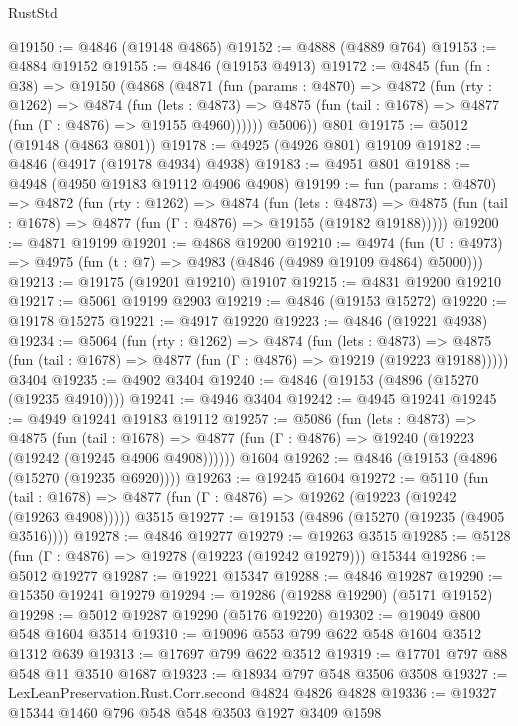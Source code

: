 \begin{lexlean}{RustStd}
\begin{coremodule}
@19150 := @4846 (@19148 @4865)
@19152 := @4888 (@4889 @764)
@19153 := @4884 @19152
@19155 := @4846 (@19153 @4913)
@19172 := @4845
    (fun (fn : @38) =>
    @19150
      (@4868
        (@4871
          (fun (params : @4870) =>
          @4872
            (fun (rty : @1262) =>
            @4874
              (fun (lets : @4873) =>
              @4875 (fun (tail : @1678) => @4877 (fun (Γ : @4876) => @19155 @4960))))))
        @5006))
    @801
@19175 := @5012 (@19148 (@4863 @801))
@19178 := @4925 (@4926 @801) @19109
@19182 := @4846 (@4917 (@19178 @4934) @4938)
@19183 := @4951 @801
@19188 := @4948 (@4950 @19183 @19112 @4906 @4908)
@19199 := fun (params : @4870) =>
  @4872
    (fun (rty : @1262) =>
    @4874
      (fun (lets : @4873) =>
      @4875 (fun (tail : @1678) => @4877 (fun (Γ : @4876) => @19155 (@19182 @19188)))))
@19200 := @4871 @19199
@19201 := @4868 @19200
@19210 := @4974
    (fun (U : @4973) => @4975 (fun (t : @7) => @4983 (@4846 (@4989 @19109 @4864) @5000)))
@19213 := @19175 (@19201 @19210) @19107
@19215 := @4831 @19200 @19210
@19217 := @5061 @19199 @2903
@19219 := @4846 (@19153 @15272)
@19220 := @19178 @15275
@19221 := @4917 @19220
@19223 := @4846 (@19221 @4938)
@19234 := @5064
    (fun (rty : @1262) =>
    @4874
      (fun (lets : @4873) =>
      @4875 (fun (tail : @1678) => @4877 (fun (Γ : @4876) => @19219 (@19223 @19188)))))
    @3404
@19235 := @4902 @3404
@19240 := @4846 (@19153 (@4896 (@15270 (@19235 @4910))))
@19241 := @4946 @3404
@19242 := @4945 @19241
@19245 := @4949 @19241 @19183 @19112
@19257 := @5086
    (fun (lets : @4873) =>
    @4875
      (fun (tail : @1678) =>
      @4877 (fun (Γ : @4876) => @19240 (@19223 (@19242 (@19245 @4906 @4908))))))
    @1604
@19262 := @4846 (@19153 (@4896 (@15270 (@19235 @6920))))
@19263 := @19245 @1604
@19272 := @5110
    (fun (tail : @1678) => @4877 (fun (Γ : @4876) => @19262 (@19223 (@19242 (@19263 @4908)))))
    @3515
@19277 := @19153 (@4896 (@15270 (@19235 (@4905 @3516))))
@19278 := @4846 @19277
@19279 := @19263 @3515
@19285 := @5128 (fun (Γ : @4876) => @19278 (@19223 (@19242 @19279))) @15344
@19286 := @5012 @19277
@19287 := @19221 @15347
@19288 := @4846 @19287
@19290 := @15350 @19241 @19279
@19294 := @19286 (@19288 @19290) (@5171 @19152)
@19298 := @5012 @19287 @19290 (@5176 @19220)
@19302 := @19049 @800 @548 @1604 @3514
@19310 := @19096 @553 @799 @622 @548 @1604 @3512 @1312 @639
@19313 := @17697 @799 @622 @3512
@19319 := @17701 @797 @88 @548 @11 @3510 @1687
@19323 := @18934 @797 @548 @3506 @3508
@19327 := LexLeanPreservation.Rust.Corr.second @4824 @4826 @4828
@19336 := @19327 @15344 @1460 @796 @548 @548 @3503 @1927 @3409 @1598

\end{coremodule}
\end{lexlean}
